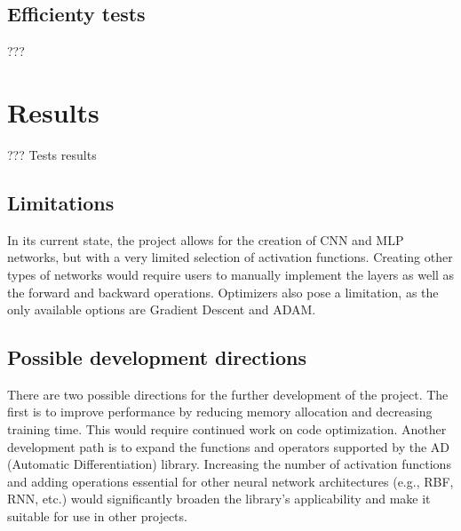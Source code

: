 \documentclass[conference]{IEEEtran}
\begin{document}
\subsection{Efficienty tests}
???

\section{Results}
??? Tests results

\subsection{Limitations}

In its current state, the project allows for the creation of CNN and MLP networks, but with a very limited selection of activation functions. Creating other types of networks would require users to manually implement the layers as well as the forward and backward operations. Optimizers also pose a limitation, as the only available options are Gradient Descent and ADAM.

\subsection{Possible development directions}
There are two possible directions for the further development of the project. The first is to improve performance by reducing memory allocation and decreasing training time. This would require continued work on code optimization.
Another development path is to expand the functions and operators supported by the AD (Automatic Differentiation) library. Increasing the number of activation functions and adding operations essential for other neural network architectures (e.g., RBF, RNN, etc.) would significantly broaden the library's applicability and make it suitable for use in other projects.
\end{document}
